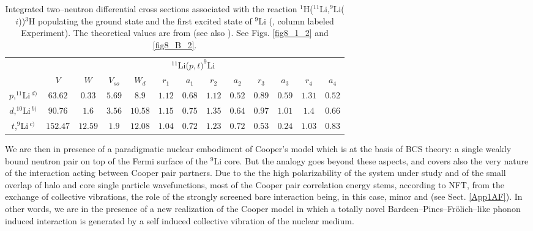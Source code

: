 \begin{table}[h!]
{\begin{tabular}{|c|c|c|c|c|c|c|c|c|c|c|c|c|}
\cline{2-13} 
\multicolumn{1}{c|}{}& \multicolumn{12}{|c|}{$^{11}$Li($p,t)^{9}$Li}           \\
\cline{2-13} 
\multicolumn{1}{c|}{} & $V$ & $W$ &  $V_{so}$ &  $W_d$ &  $r_1$ &  $a_1$ &  $r_2$ &  $a_2$ &  $r_3$ &  $a_3$ &  $r_4$ &  $a_4$            \\
\hline 
$p$,\;$^{11}$Li$\,^{d)}$ & $63.62$ & $0.33$ &  $5.69$ &  $8.9$ &  $1.12$ &  $0.68$ &  $1.12$ &  $0.52$ &  $0.89$ &  $0.59$ &  $1.31$ &  $0.52$ \\
\hline 
$d$,\;$^{10}$Li$\,^{b)}$ & $90.76$ & $1.6$ &  $3.56$ &  $10.58$ &  $1.15$ &  $0.75$ &  $1.35$ &  $0.64$ &  $0.97$ &  $1.01$ &  $1.4$ &  $0.66$ \\
\hline 
$t$,\;$^{9}$Li$\,^{c)}$ & $152.47$ & $12.59$ &  $1.9$ &  $12.08$ &  $1.04$ &  $0.72$ &  $1.23$ &  $0.72$ &  $0.53$ &  $0.24$ &  $1.03$ &  $0.83$ \\
\hline 

\hline 
  \end{tabular}}
   \caption{Integrated two--neutron differential cross sections associated with the reaction $^1$H($^{11}$Li,$^9$Li($i$))$^{3}$H populating the ground state and the first excited state of $^{9}$Li (\cite{Tanihata:08}, column labeled Experiment). The theoretical values are from \cite{Potel:10} (see also \cite{Potel:13}). See Figs. \ref{fig8_1_2} and \ref{fig8_B_2}.}
\label{tab6.1.2}
\end{table}




We are then in presence of a paradigmatic nuclear embodiment of Cooper's model which is at the basis of BCS theory: a single weakly bound neutron pair on top of the Fermi surface of the ${}^9$Li core. But the analogy goes beyond these aspects, and covers also the very nature of the interaction acting between Cooper pair partners. Due to the  the high polarizability of the system under study and of the small overlap of halo and core single particle wavefunctions, most of the Cooper pair correlation energy stems, according to NFT, from the exchange of collective vibrations, the role of the strongly screened bare interaction being, in this case, minor and  (see Sect. \ref{App1AF}). In other words, we are in the presence of a new realization of the Cooper model in which a totally novel Bardeen--Pines--Fr\"olich--like phonon induced interaction is generated by a self induced collective vibration of the nuclear medium.



